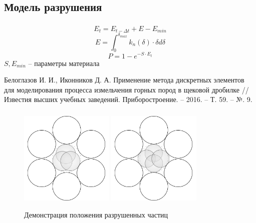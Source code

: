 \documentclass[c]{beamer}  %
\begin{document}
\subsection{Модель разрушения}

\begin{frame}
\frametitle{\insertsection} 
\framesubtitle{\insertsubsection}
\begin{equation}
E_t = E_{t-\Delta t} + E - E_{min}
\end{equation}
\begin{equation}
E = \int^{\delta_{max}}_0 k_n (\delta) \cdot \delta d \delta
\end{equation}
\begin{equation}
P = 1 - e^{-S \cdot E_t} 
\end{equation}
$S, E_{min}$ -- параметры материала

\small Белоглазов И. И., Иконников Д. А. Применение метода дискретных элементов для моделирования процесса измельчения горных пород в щековой дробилке //Известия высших учебных заведений. Приборостроение. – 2016. – Т. 59. – №. 9.
\end{frame}



\begin{frame}
\frametitle{\insertsection} 
\framesubtitle{\insertsubsection}
\begin{figure}[h!]
	\centering
	\includegraphics[width=0.4\textwidth]{3_balls}
	\includegraphics[width=0.4\textwidth]{4_balls}
	\caption{Демонстрация положения разрушенных частиц}
\end{figure} 
\end{frame}
\end{document}
